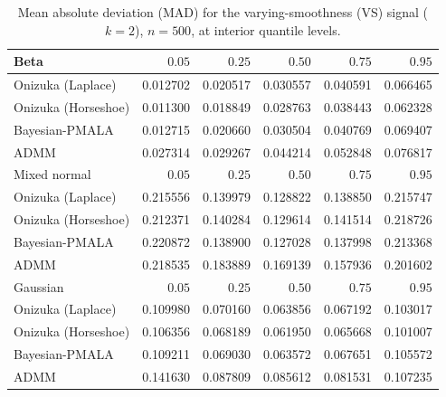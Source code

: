 \begin{table}[!htbp]
\centering
\small
\caption{Mean absolute deviation (MAD) for the varying-smoothness (VS) signal ($k=2$), $n=500$, at interior quantile levels.}
\label{tab:vs_int_mad}
\begin{tabular}{lrrrrr}
\toprule
Beta & $0.05$ & $0.25$ & $0.50$ & $0.75$ & $0.95$ \\
\midrule
Onizuka (Laplace) & 0.012702 & 0.020517 & 0.030557 & 0.040591 & 0.066465 \\
Onizuka (Horseshoe) & 0.011300 & 0.018849 & 0.028763 & 0.038443 & 0.062328 \\
Bayesian-PMALA & 0.012715 & 0.020660 & 0.030504 & 0.040769 & 0.069407 \\
ADMM & 0.027314 & 0.029267 & 0.044214 & 0.052848 & 0.076817 \\
\midrule
Mixed normal & $0.05$ & $0.25$ & $0.50$ & $0.75$ & $0.95$ \\
\midrule
Onizuka (Laplace) & 0.215556 & 0.139979 & 0.128822 & 0.138850 & 0.215747 \\
Onizuka (Horseshoe) & 0.212371 & 0.140284 & 0.129614 & 0.141514 & 0.218726 \\
Bayesian-PMALA & 0.220872 & 0.138900 & 0.127028 & 0.137998 & 0.213368 \\
ADMM & 0.218535 & 0.183889 & 0.169139 & 0.157936 & 0.201602 \\
\midrule
Gaussian & $0.05$ & $0.25$ & $0.50$ & $0.75$ & $0.95$ \\
\midrule
Onizuka (Laplace) & 0.109980 & 0.070160 & 0.063856 & 0.067192 & 0.103017 \\
Onizuka (Horseshoe) & 0.106356 & 0.068189 & 0.061950 & 0.065668 & 0.101007 \\
Bayesian-PMALA & 0.109211 & 0.069030 & 0.063572 & 0.067651 & 0.105572 \\
ADMM & 0.141630 & 0.087809 & 0.085612 & 0.081531 & 0.107235 \\
\bottomrule
\end{tabular}
\end{table}

